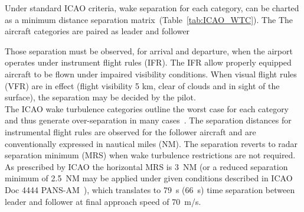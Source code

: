 Under standard ICAO criteria, wake separation for each category, can be charted as a minimum distance separation matrix~(Table~\ref{tab:ICAO_WTC}). The The aircraft categories are paired as leader and follower 

Those separation must be observed, for arrival and departure, when the airport operates under instrument flight rules (IFR). The IFR allow properly equipped aircraft to be flown under impaired visibility conditions. When visual flight rules (VFR) are in effect (flight visibility 5 km, clear of clouds and in sight of the surface), the separation may be decided by the pilot.~\cite{gerz_commercial_2002, icao_annex_2005} \\

The ICAO wake turbulence categories  outline the worst case for each category and thus generate over-separation in many cases~\cite{noauthor_recat_2018, rooseleer2015recat}. The separation distances for instrumental flight rules are observed for the follower aircraft and are conventionally expressed in nautical miles (NM). The separation reverts to radar separation minimum (MRS) when wake turbulence restrictions are not required. As  prescribed  by  ICAO  the  horizontal MRS is 3~NM (or a reduced separation minimum of 2.5~NM may be applied under given conditions described in ICAO Doc 4444 PANS-AM~\cite{doc44444}), which translates to 79~s (66~s) time separation between leader and follower at final approach speed of 70~m/s.


\begin{table}[h]
\centering
{}
\caption[ICAO wake turbulence categories and separation minima]{ICAO wake turbulence categories and separation minima to avoid wake vortex encounter~\cite{noauthor_recat_2018, rooseleer2015recat}.} \label{tab:ICAO_WTC}
\end{table}

